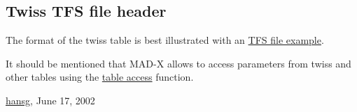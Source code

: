




\subsection{Twiss TFS file header}

 The format of the twiss table is best illustrated with an \href{select.html#tfs}{TFS file example}. 

 It should be mentioned that MAD-X allows to access parameters from twiss and other tables using the \href{../Introduction/expression.html#table}{table access} function. 

\href{http://www.cern.ch/Hans.Grote/hansg_sign.html}{hansg}, June 17, 2002 

